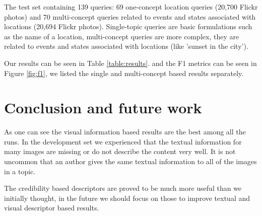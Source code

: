 \documentclass{acm_proc_article-me}
\begin{document}
The test set containing 139 queries: 69 one-concept location queries (20,700 Flickr photos) and 70 multi-concept queries related to events and states associated with locations (20,694 Flickr photos). Single-topic queries are basic formulations such as the name of a location, multi-concept queries are more complex, they are related to events and states associated with locations (like 'sunset in the city').

Our results can be seen in Table \ref{table:results}. and the F1 metrics can be seen in Figure \ref{fig:f1}, we listed the single and multi-concept based results separately. 

\section{Conclusion and future work}

As one can see the visual information based results are the best among all the runs. In the development set we experienced that the textual information for many images are missing or do not describe the content very well. It is not uncommon that an author gives the same textual information to all of the images in a topic.

The credibility based descriptors are proved to be much more useful than we initially thought, in the future we should focus on those to improve textual and visual descriptor based results.
\newpage


\end{document}
